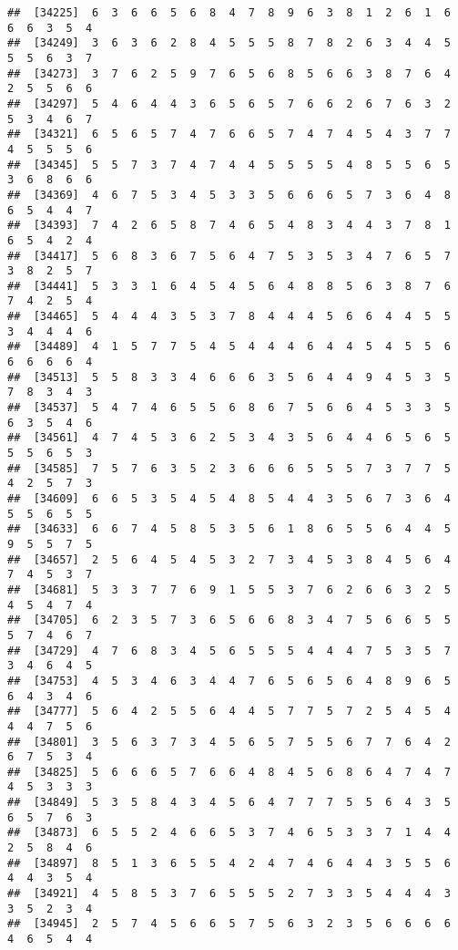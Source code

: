 \documentclass[
]{book}
\begin{document}
\begin{verbatim}
##  [34225]  6  3  6  6  5  6  8  4  7  8  9  6  3  8  1  2  6  1  6  6  6  3  5  4
##  [34249]  3  6  3  6  2  8  4  5  5  5  8  7  8  2  6  3  4  4  5  5  5  6  3  7
##  [34273]  3  7  6  2  5  9  7  6  5  6  8  5  6  6  3  8  7  6  4  2  5  5  6  6
##  [34297]  5  4  6  4  4  3  6  5  6  5  7  6  6  2  6  7  6  3  2  5  3  4  6  7
##  [34321]  6  5  6  5  7  4  7  6  6  5  7  4  7  4  5  4  3  7  7  4  5  5  5  6
##  [34345]  5  5  7  3  7  4  7  4  4  5  5  5  5  4  8  5  5  6  5  3  6  8  6  6
##  [34369]  4  6  7  5  3  4  5  3  3  5  6  6  6  5  7  3  6  4  8  6  5  4  4  7
##  [34393]  7  4  2  6  5  8  7  4  6  5  4  8  3  4  4  3  7  8  1  6  5  4  2  4
##  [34417]  5  6  8  3  6  7  5  6  4  7  5  3  5  3  4  7  6  5  7  3  8  2  5  7
##  [34441]  5  3  3  1  6  4  5  4  5  6  4  8  8  5  6  3  8  7  6  7  4  2  5  4
##  [34465]  5  4  4  4  3  5  3  7  8  4  4  4  5  6  6  4  4  5  5  3  4  4  4  6
##  [34489]  4  1  5  7  7  5  4  5  4  4  4  6  4  4  5  4  5  5  6  6  6  6  6  4
##  [34513]  5  5  8  3  3  4  6  6  6  3  5  6  4  4  9  4  5  3  5  7  8  3  4  3
##  [34537]  5  4  7  4  6  5  5  6  8  6  7  5  6  6  4  5  3  3  5  6  3  5  4  6
##  [34561]  4  7  4  5  3  6  2  5  3  4  3  5  6  4  4  6  5  6  5  5  5  6  5  3
##  [34585]  7  5  7  6  3  5  2  3  6  6  6  5  5  5  7  3  7  7  5  4  2  5  7  3
##  [34609]  6  6  5  3  5  4  5  4  8  5  4  4  3  5  6  7  3  6  4  5  5  6  5  5
##  [34633]  6  6  7  4  5  8  5  3  5  6  1  8  6  5  5  6  4  4  5  9  5  5  7  5
##  [34657]  2  5  6  4  5  4  5  3  2  7  3  4  5  3  8  4  5  6  4  7  4  5  3  7
##  [34681]  5  3  3  7  7  6  9  1  5  5  3  7  6  2  6  6  3  2  5  4  5  4  7  4
##  [34705]  6  2  3  5  7  3  6  5  6  6  8  3  4  7  5  6  6  5  5  5  7  4  6  7
##  [34729]  4  7  6  8  3  4  5  6  5  5  5  4  4  4  7  5  3  5  7  3  4  6  4  5
##  [34753]  4  5  3  4  6  3  4  4  7  6  5  6  5  6  4  8  9  6  5  6  4  3  4  6
##  [34777]  5  6  4  2  5  5  6  4  4  5  7  7  5  7  2  5  4  5  4  4  4  7  5  6
##  [34801]  3  5  6  3  7  3  4  5  6  5  7  5  5  6  7  7  6  4  2  6  7  5  3  4
##  [34825]  5  6  6  6  5  7  6  6  4  8  4  5  6  8  6  4  7  4  7  4  5  3  3  3
##  [34849]  5  3  5  8  4  3  4  5  6  4  7  7  7  5  5  6  4  3  5  6  5  7  6  3
##  [34873]  6  5  5  2  4  6  6  5  3  7  4  6  5  3  3  7  1  4  4  2  5  8  4  6
##  [34897]  8  5  1  3  6  5  5  4  2  4  7  4  6  4  4  3  5  5  6  4  4  3  5  4
##  [34921]  4  5  8  5  3  7  6  5  5  5  2  7  3  3  5  4  4  4  3  3  5  2  3  4
##  [34945]  2  5  7  4  5  6  6  5  7  5  6  3  2  3  5  6  6  6  6  4  6  5  4  4

\end{verbatim}
\end{document}
